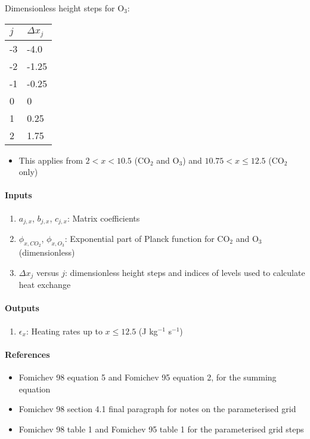    Dimensionless height steps for O$_3$:
   \begin{table}[H]
     \begin{tabular}{ll}\hline
       \textbf{$j$} & \textbf{$\Delta x_j$} \\
       \hline
       -3           & -4.0                 \\
       -2           & -1.25                 \\
       -1           & -0.25                 \\
       0            & 0                     \\
       1            & 0.25                  \\
       2            & 1.75                  \\
       \hline
     \end{tabular}
   \end{table}

   \begin{itemize}  
   \item This applies from $2 < x < 10.5$ (CO$_2$ and O$_3$) and 
     $10.75 < x \leq 12.5$ (CO$_2$ only)
   \end{itemize}   
   
   \paragraph{Inputs}
   \begin{enumerate}
   \item $a_{j,x}$, $b_{j,x}$, $c_{j,x}$: Matrix coefficients
   \item $\phi_{x,CO_2}$, $\phi_{x,O_3}$: Exponential part of Planck function 
     for CO$_2$ and O$_3$ (dimensionless)
   \item $\Delta x_j$ versus $j$: dimensionless height steps and indices 
     of levels used to calculate heat exchange 
   \end{enumerate}

   \paragraph{Outputs}
   \begin{enumerate}
   \item $\epsilon_x$: Heating rates up to $x \leq 12.5$ (J kg$^{-1}$ s$^{-1}$)
   \end{enumerate}

   \paragraph{References}
   \begin{itemize}
   \item Fomichev 98 equation 5 and Fomichev 95 equation 2, for the summing
     equation
   \item Fomichev 98 section 4.1 final paragraph for notes on the 
     parameterised grid
   \item Fomichev 98 table 1 and Fomichev 95 table 1 for the 
     parameterised grid steps
   \end{itemize}


